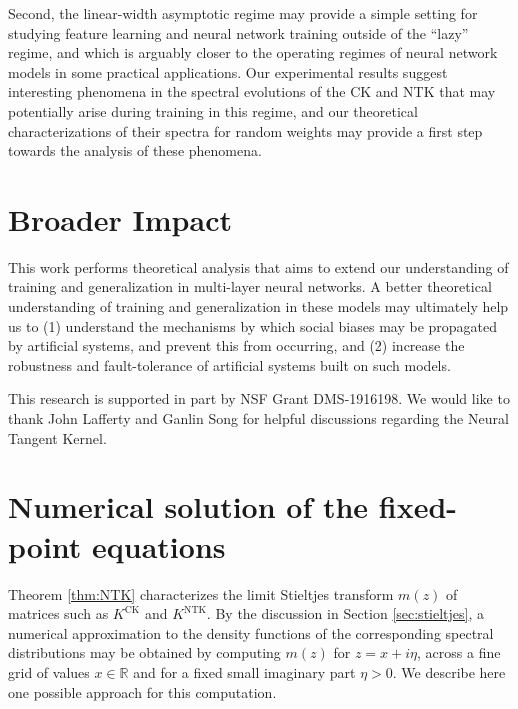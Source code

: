 \documentclass{article}
\theoremstyle{definition}
\newcommand{\R}{\mathbb{R}}
\newcommand{\CK}{\text{CK}}
\newcommand{\NTK}{\text{NTK}}
\newcommand{\1}{\mathbf{1}}
\begin{document}
Second, the linear-width asymptotic regime may provide a simple
setting for studying feature learning and neural network training
outside of the ``lazy'' regime, and which is arguably closer to the operating
regimes of neural network models in some practical applications. Our
experimental results suggest interesting phenomena in the spectral evolutions of
the CK and NTK that may potentially arise during training in this
regime, and our theoretical characterizations of their spectra for random
weights may provide a first step towards the analysis of these phenomena.

\section*{Broader Impact}

This work performs theoretical analysis that aims to extend our understanding
of training and generalization in multi-layer neural networks. A better
theoretical understanding of training and generalization in these models may
ultimately help us to (1) understand the mechanisms
by which social biases may be propagated by artificial systems, and prevent
this from occurring, and (2) increase the robustness and fault-tolerance of
artificial systems built on such models.

\begin{ack}
This research is supported in part by NSF Grant DMS-1916198. We would like to
thank John Lafferty and Ganlin Song for helpful discussions regarding
the Neural Tangent Kernel.
\end{ack}

{\small


}

\newpage

\appendix

\section{Numerical solution of the fixed-point equations}\label{appendix:computation}

Theorem \ref{thm:NTK} characterizes the limit Stieltjes transform $m(z)$
of matrices such as $K^\CK$ and $K^\NTK$. By the
discussion in Section \ref{sec:stieltjes}, a numerical
approximation to the density functions of the corresponding 
spectral distributions may be obtained by computing $m(z)$ for $z=x+i\eta$,
across a fine grid of values $x \in \R$ and for a fixed small imaginary part
$\eta>0$. We describe here one possible approach for this computation.
\end{document}

